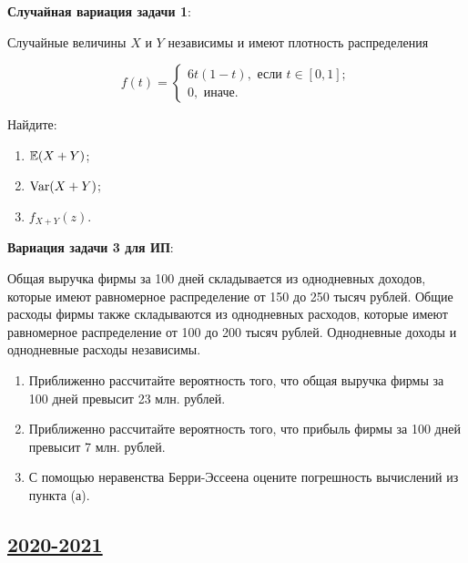 \textbf{Случайная вариация задачи 1}:

Случайные величины $X$ и $Y$ независимы и имеют плотность распределения

\[
f(t) = 
\begin{cases}
6 t (1-t), \text{ если } t \in [0,1]; \\
0, \text{ иначе.}
\end{cases}
\]

Найдите:

\begin{enumerate}
    \item $\operatorname{\mathbb{E}}(X+Y)$;
    \item $\operatorname{Var}(X+Y)$;
    \item $f_{X+Y}(z)$.
\end{enumerate}


\textbf{Вариация задачи 3 для ИП}:

Общая выручка фирмы за 100 дней складывается из однодневных доходов, которые имеют равномерное распределение от 150 до 250 тысяч рублей. 
Общие расходы фирмы также складываются из однодневных расходов, которые имеют равномерное распределение от 100 до 200 тысяч рублей. 
Однодневные доходы и однодневные расходы независимы.

\begin{enumerate}
    \item Приближенно рассчитайте вероятность того, что общая выручка фирмы за 100 дней превысит 23 млн. рублей.
    \item Приближенно рассчитайте вероятность того, что прибыль фирмы за 100 дней превысит 7 млн. рублей.
    \item С помощью неравенства Берри-Эссеена оцените погрешность вычислений из пункта (а). 
\end{enumerate}





\subsection[2020-2021]{\hyperref[sec:sol_kr_02_2020_2021]{2020-2021}}
\label{sec:kr_02_2020_2021}


